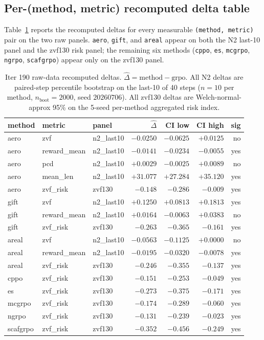 \documentclass{article}
\begin{document}
\subsection{Per-(method, metric) recomputed delta table}
Table~\ref{tab:p6-iter190-recomputed} reports the recomputed deltas for
every measurable \texttt{(method, metric)} pair on the two raw panels.
\verb|aero|, \verb|gift|, and \verb|areal| appear on both the
N2 last-10 panel and the zvf130 risk panel; the remaining six methods
(\verb|cppo|, \verb|es|, \verb|mcgrpo|, \verb|ngrpo|, \verb|scafgrpo|)
appear only on the zvf130 panel.

\begin{table}[h]
\centering
\small
\begin{tabular}{lllrrrr}
\toprule
method & metric & panel & $\hat\Delta$ & CI low & CI high & sig \\
\midrule
aero & zvf         & n2\_last10    & $-0.0250$ & $-0.0625$ & $+0.0125$ & no  \\
aero & reward\_mean& n2\_last10    & $-0.0141$ & $-0.0234$ & $-0.0055$ & yes \\
aero & pcd         & n2\_last10    & $+0.0029$ & $-0.0025$ & $+0.0089$ & no  \\
aero & mean\_len   & n2\_last10    & $+31.077$ & $+27.284$ & $+35.120$ & yes \\
aero & zvf\_risk   & zvf130        & $-0.148$  & $-0.286$  & $-0.009$  & yes \\
\midrule
gift & zvf         & n2\_last10    & $+0.1250$ & $+0.0813$ & $+0.1813$ & yes \\
gift & reward\_mean& n2\_last10    & $+0.0164$ & $-0.0063$ & $+0.0383$ & no  \\
gift & zvf\_risk   & zvf130        & $-0.263$  & $-0.365$  & $-0.161$  & yes \\
\midrule
areal& zvf         & n2\_last10    & $-0.0563$ & $-0.1125$ & $+0.0000$ & no  \\
areal& reward\_mean& n2\_last10    & $-0.0195$ & $-0.0320$ & $-0.0078$ & yes \\
areal& zvf\_risk   & zvf130        & $-0.246$  & $-0.355$  & $-0.137$  & yes \\
\midrule
cppo & zvf\_risk   & zvf130        & $-0.151$  & $-0.253$  & $-0.049$  & yes \\
es   & zvf\_risk   & zvf130        & $-0.273$  & $-0.375$  & $-0.171$  & yes \\
mcgrpo& zvf\_risk  & zvf130        & $-0.174$  & $-0.289$  & $-0.060$  & yes \\
ngrpo& zvf\_risk   & zvf130        & $-0.131$  & $-0.239$  & $-0.023$  & yes \\
scafgrpo& zvf\_risk& zvf130        & $-0.352$  & $-0.456$  & $-0.249$  & yes \\
\bottomrule
\end{tabular}
\caption{Iter 190 raw-data recomputed deltas. $\hat\Delta = \text{method} - \text{grpo}$.
All N2 deltas are paired-step percentile bootstrap on the last-10 of 40
steps ($n{=}10$ per method, $n_{\text{boot}}{=}2000$, seed $20260706$).
All zvf130 deltas are Welch-normal-approx 95\% on the 5-seed
per-method aggregated risk index.}
\label{tab:p6-iter190-recomputed}
\end{table}
\end{document}
